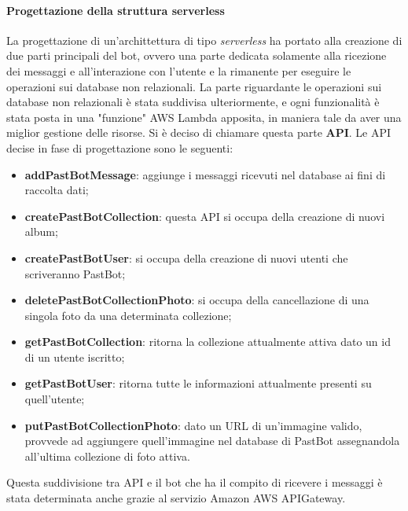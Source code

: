 \paragraph*{Progettazione della struttura serverless} La progettazione di
un'archittettura di tipo \textit{serverless} ha portato alla creazione di due
parti principali del bot, ovvero una parte dedicata solamente alla ricezione
dei messaggi e all'interazione con l'utente e la rimanente per eseguire le
operazioni sui database non relazionali.
La parte riguardante le operazioni sui database non relazionali è stata
suddivisa ulteriormente, e ogni funzionalità è stata posta in una "funzione"
AWS Lambda apposita, in maniera tale da aver una miglior gestione delle
risorse. Si è deciso di chiamare questa parte \textbf{API}. Le API decise in
fase di progettazione sono le seguenti:
\begin{itemize}
  \item \textbf{addPastBotMessage}: aggiunge i messaggi ricevuti nel database
ai fini di raccolta dati;

  \item \textbf{createPastBotCollection}: questa API si occupa della creazione
di nuovi album;

  \item \textbf{createPastBotUser}: si occupa della creazione di nuovi utenti
che scriveranno PastBot;

  \item \textbf{deletePastBotCollectionPhoto}: si occupa della cancellazione di
una singola foto da una determinata collezione;

  \item \textbf{getPastBotCollection}: ritorna la collezione attualmente attiva
dato un id di un utente iscritto;

  \item \textbf{getPastBotUser}: ritorna tutte le informazioni attualmente
presenti su quell'utente; %

  \item \textbf{putPastBotCollectionPhoto}: dato un URL di un'immagine valido,
provvede ad aggiungere quell'immagine nel database di PastBot assegnandola
all'ultima collezione di foto attiva.
\end{itemize}

Questa suddivisione tra API e il bot che ha il compito di ricevere i messaggi è
stata determinata anche grazie al servizio Amazon AWS APIGateway.


